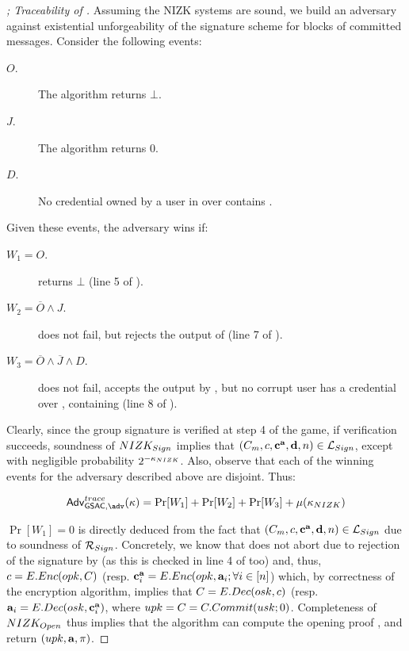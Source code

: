 \begin{proof}[; Traceability of \GSACGen]
  Assuming the NIZK systems are sound, we build an adversary against existential
  unforgeability of the signature scheme for blocks of committed messages.
  Consider the following events:

  \begin{description}
  \item[$O$.] The \Open algorithm returns $\bot$.
  \item[$J$.] The \Judge algorithm returns $0$.
  \item[$D$.] No credential owned by a user in \CU over \attrs contains \dattrs.
  \end{description}

  Given these events, the adversary wins if:

  \begin{description}
  \item[$W_1 = O$.] \Open returns $\bot$ (line 5 of \ExpGSACTrace).
  \item[$W_2 = \overline{O} \land J$.] \Open does not fail, but \Judge rejects
    the output of \Open (line 7 of \ExpGSACTrace).
  \item[$W_3 = \overline{O} \land \overline{J} \land D$.] \Open does not fail,
    \Judge accepts the output by \Open, but no corrupt user has a credential
    over \attrs, containing \dattrs (line 8 of \ExpGSACTrace).
  \end{description}

  Clearly, since the group signature is verified at step 4 of the game, if
  verification succeeds, soundness of $NIZK_{Sign}$ implies that $(C_m,
  c,\mathbf{c}^{\mathbf{a}},\mathbf{d},n) \in \mathcal{L}_{Sign}$, except with negligible
  probability $2^{-\kappa_{NIZK}}$. Also, observe that each of the winning events
  for the adversary described above are disjoint. Thus:

  \begin{equation}
    \AdvGSACTrace(\secpar) = \Pr[W_1]+\Pr[W_2]+\Pr[W_3]+\negl(\NIZKsecpar)
  \end{equation}

  $\Pr[W_1]=0$ is directly deduced from the fact that $(C_m,c,
  \mathbf{c}^{\mathbf{a}},\mathbf{d},n)
  \in \mathcal{L}_{Sign}$ due to soundness of $\mathcal{R}_{Sign}$. Concretely,
  we know that \Open does not abort due to rejection of the signature by
  \Verify (as this is checked in line 4 of \ExpGSACTrace too) and, thus,
  $c = E.Enc(opk,C)$ (resp. $\mathbf{c}^{\mathbf{a}}_i = E.Enc(opk,\mathbf{a}_i;
  \forall i \in [n]$) which, by correctness of the encryption algorithm,
  implies that $C = E.Dec(osk,c)$ (resp. $\mathbf{a}_i =
  E.Dec(osk,\mathbf{c}^{\mathbf{a}}_i)$, where $upk=C=C.Commit(usk;0)$.
  Completeness of $NIZK_{Open}$ thus implies that the \Open algorithm can
  compute the opening proof \oproof, and return $(upk,\mathbf{a},\pi)$.
  

\end{proof}

